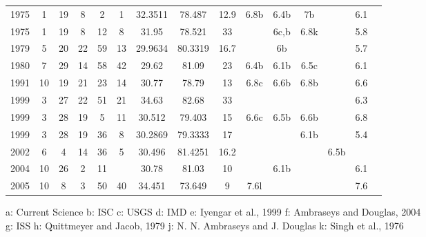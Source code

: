 \begin{flushleft}
\begin{longtable}{|c|c|c|c|c|c|c|c|c|c|c|c|c|c|c|}
1975 & 1  & 19 & 8  & 2  & 1  & 32.3511 & 78.487  & 12.9 & 6.8b  & 6.4b & 7b    &      & 6.1  &        \\
1975 & 1  & 19 & 8  & 12 & 8  & 31.95   & 78.521  & 33   &       & 6c,b & 6.8k  &      & 5.8  &        \\
1979 & 5  & 20 & 22 & 59 & 13 & 29.9634 & 80.3319 & 16.7 &       & 6b   &       &      & 5.7  &        \\
1980 & 7  & 29 & 14 & 58 & 42 & 29.62   & 81.09   & 23   & 6.4b  & 6.1b & 6.5c  &      & 6.1  &        \\
1991 & 10 & 19 & 21 & 23 & 14 & 30.77   & 78.79   & 13   & 6.8c  & 6.6b & 6.8b  &      & 6.6  &        \\
1999 & 3  & 27 & 22 & 51 & 21 & 34.63   & 82.68   & 33   &       &      &       &      & 6.3  &        \\
1999 & 3  & 28 & 19 & 5  & 11 & 30.512  & 79.403  & 15   & 6.6c  & 6.5b & 6.6b  &      & 6.8  &        \\
1999 & 3  & 28 & 19 & 36 & 8  & 30.2869 & 79.3333 & 17   &       &      & 6.1b  &      & 5.4  &        \\
2002 & 6  & 4  & 14 & 36 & 5  & 30.496  & 81.4251 & 16.2 &       &      &       & 6.5b &      &        \\
2004 & 10 & 26 & 2  & 11 &    & 30.78   & 81.03   & 10   &       & 6.1b &       &      & 6.1  &        \\
2005 & 10 & 8  & 3  & 50 & 40 & 34.451  & 73.649  & 9    & 7.6l  &      &       &      & 7.6  &       
\hline

\end{longtable}
\end{flushleft}

\begin{flushleft}
\footnotesize

    a: Current Science \textbar  b: ISC  \textbar   c: USGS  \textbar   d: IMD \textbar   e: Iyengar et al., 1999  \textbar   f: Ambraseys and Douglas, 2004 \\
    g: ISS  \textbar   h: Quittmeyer and Jacob, 1979  \textbar   j: N. N. Ambraseys and J. Douglas  \textbar   k: Singh et al., 1976

\end{flushleft}


